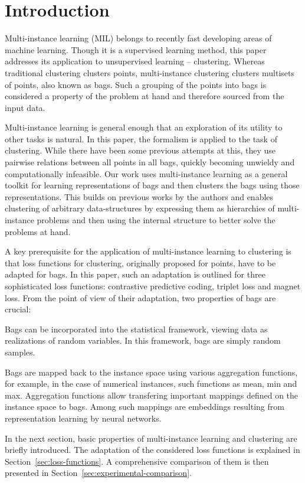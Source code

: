\section{Introduction}

Multi-instance learning (MIL) belongs to recently fast developing areas of machine learning. Though it is a supervised learning method, this paper addresses its application to unsupervised learning -- clustering. Whereas traditional clustering clusters points, multi-instance clustering clusters multisets of points, also known as bags. Such a grouping of the points into bags is considered a property of the problem at hand and therefore sourced from the input data.

Multi-instance learning is general enough that an exploration of its utility to other tasks is natural. In this paper, the formalism is applied to the task of clustering. While there have been some previous attempts at this, they use pairwise relations between all points in all bags, quickly becoming unwieldy and computationally infeasible. Our work uses multi-instance learning as a general toolkit for learning representations of bags and then clusters the bags using those representations. This builds on previous works by the authors and enables clustering of arbitrary data-structures by expressing them as hierarchies of multi-instance problems and then using the internal structure to better solve the problems at hand.

A key prerequisite for the application of multi-instance learning to clustering is that loss functions for clustering, originally proposed for points, have to be adapted for bags. In this paper, such an adaptation is outlined for three sophisticated loss functions: contrastive predictive coding, triplet loss and magnet loss. From the point of view of their adaptation, two properties of bags are crucial:
\begin{romanitems}
	\item Bags can be incorporated into the statistical framework, viewing data as realizations of random variables. In this framework, bags are simply random samples.
	\item Bags are mapped back to the instance space using various aggregation functions, for example, in the case of numerical instances, such functions as mean, min and max. Aggregation functions allow transfering important mappings defined on the instance space to bags. Among such mappings are embeddings resulting from representation learning by neural networks.
\end{romanitems}

In the next section, basic properties of multi-instance learning and clustering are briefly introduced. The adaptation of the considered loss functions is explained in Section~\ref{sec:loss-functions}. A comprehensive comparison of them is then presented in Section~\ref{sec:experimental-comparison}.
